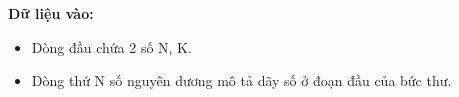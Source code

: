 \textbf{Dữ liệu vào:
}
\begin{itemize}
	\item Dòng đầu chứa 2 số N, K.
	\item Dòng thứ N số nguyên dương mô tả dãy số ở đoạn đầu của bức thư.
\end{itemize}